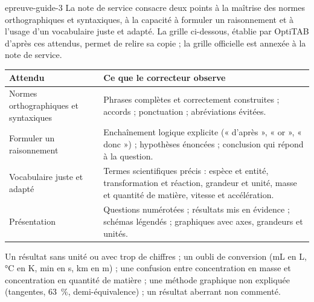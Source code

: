 \begin{blocEdition}{epreuve-guide-3}
\fontsize{10}{13.5}\selectfont
{}
La note de service consacre deux points à la maîtrise des normes orthographiques et syntaxiques, à la capacité à formuler
un raisonnement et à l'usage d'un vocabulaire juste et adapté. La grille ci-dessous, établie par OptiTAB d'après ces
attendus, permet de relire sa copie ; la grille officielle est annexée à la note de service.\par\smallskip
\begin{tabularx}{\linewidth}{@{}p{42mm}Y@{}}\toprule
\textbf{Attendu} & \textbf{Ce que le correcteur observe} \\\midrule
Normes orthographiques et syntaxiques & Phrases complètes et correctement construites ; accords ; ponctuation ; abréviations
évitées. \\[1mm]
Formuler un raisonnement & Enchaînement logique explicite (« d'après », « or », « donc ») ; hypothèses énoncées ; conclusion
qui répond à la question. \\[1mm]
Vocabulaire juste et adapté & Termes scientifiques précis : espèce et entité, transformation et réaction, grandeur et unité,
masse et quantité de matière, vitesse et accélération. \\[1mm]
Présentation & Questions numérotées ; résultats mis en évidence ; schémas légendés ; graphiques avec axes, grandeurs
et unités. \\\bottomrule
\end{tabularx}
Un résultat sans unité ou avec trop de chiffres ; un oubli de conversion (mL en L, \unit{\degreeCelsius} en K, min en s, km en m) ;
une confusion entre concentration en masse et concentration en quantité de matière ; une méthode graphique non
expliquée (tangentes, 63~\%, demi-équivalence) ; un résultat aberrant non commenté.
\end{blocEdition}


